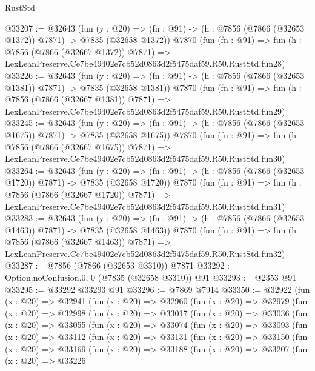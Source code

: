 \begin{lexlean}{RustStd}
\begin{coremodule}
@33207 := @32643
    (fun (y : @20) =>
    (fn : @91) -> (h : @7856 (@7866 (@32653 @1372)) @7871) -> @7835 (@32658 @1372))
    @7870
    (fun (fn : @91) =>
    fun (h : @7856 (@7866 (@32667 @1372)) @7871) =>
    LexLeanPreserve.Ce7be49402e7cb52d0863d2f5475daf59.R50.RustStd.fun28)
@33226 := @32643
    (fun (y : @20) =>
    (fn : @91) -> (h : @7856 (@7866 (@32653 @1381)) @7871) -> @7835 (@32658 @1381))
    @7870
    (fun (fn : @91) =>
    fun (h : @7856 (@7866 (@32667 @1381)) @7871) =>
    LexLeanPreserve.Ce7be49402e7cb52d0863d2f5475daf59.R50.RustStd.fun29)
@33245 := @32643
    (fun (y : @20) =>
    (fn : @91) -> (h : @7856 (@7866 (@32653 @1675)) @7871) -> @7835 (@32658 @1675))
    @7870
    (fun (fn : @91) =>
    fun (h : @7856 (@7866 (@32667 @1675)) @7871) =>
    LexLeanPreserve.Ce7be49402e7cb52d0863d2f5475daf59.R50.RustStd.fun30)
@33264 := @32643
    (fun (y : @20) =>
    (fn : @91) -> (h : @7856 (@7866 (@32653 @1720)) @7871) -> @7835 (@32658 @1720))
    @7870
    (fun (fn : @91) =>
    fun (h : @7856 (@7866 (@32667 @1720)) @7871) =>
    LexLeanPreserve.Ce7be49402e7cb52d0863d2f5475daf59.R50.RustStd.fun31)
@33283 := @32643
    (fun (y : @20) =>
    (fn : @91) -> (h : @7856 (@7866 (@32653 @1463)) @7871) -> @7835 (@32658 @1463))
    @7870
    (fun (fn : @91) =>
    fun (h : @7856 (@7866 (@32667 @1463)) @7871) =>
    LexLeanPreserve.Ce7be49402e7cb52d0863d2f5475daf59.R50.RustStd.fun32)
@33287 := @7856 (@7866 (@32653 @3310)) @7871
@33292 := Option.noConfusion.{0, 0} (@7835 (@32658 @3310)) @91
@33293 := @2353 @91
@33295 := @33292 @33293 @91
@33296 := @7869 @7914
@33350 := @32922
    (fun (x : @20) =>
    @32941
      (fun (x : @20) =>
      @32960
        (fun (x : @20) =>
        @32979
          (fun (x : @20) =>
          @32998
            (fun (x : @20) =>
            @33017
              (fun (x : @20) =>
              @33036
                (fun (x : @20) =>
                @33055
                  (fun (x : @20) =>
                  @33074
                    (fun (x : @20) =>
                    @33093
                      (fun (x : @20) =>
                      @33112
                        (fun (x : @20) =>
                        @33131
                          (fun (x : @20) =>
                          @33150
                            (fun (x : @20) =>
                            @33169
                              (fun (x : @20) =>
                              @33188
                                (fun (x : @20) =>
                                @33207
                                  (fun (x : @20) =>
                                  @33226

\end{coremodule}
\end{lexlean}
